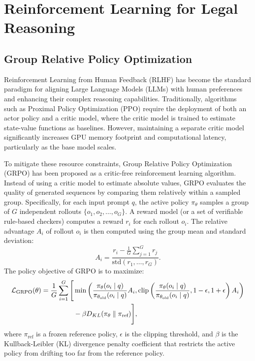 \section{Reinforcement Learning for Legal Reasoning}

\subsection{Group Relative Policy Optimization}

Reinforcement Learning from Human Feedback (RLHF) has become the standard paradigm for aligning Large Language Models (LLMs) with human preferences and enhancing their complex reasoning capabilities. Traditionally, algorithms such as Proximal Policy Optimization (PPO) require the deployment of both an actor policy and a critic model, where the critic model is trained to estimate state-value functions as baselines. However, maintaining a separate critic model significantly increases GPU memory footprint and computational latency, particularly as the base model scales.

To mitigate these resource constraints, Group Relative Policy Optimization (GRPO) has been proposed as a critic-free reinforcement learning algorithm. Instead of using a critic model to estimate absolute values, GRPO evaluates the quality of generated sequences by comparing them relatively within a sampled group. Specifically, for each input prompt $q$, the active policy $\pi_\theta$ samples a group of $G$ independent rollouts $\{o_1, o_2, \dots, o_G\}$. A reward model (or a set of verifiable rule-based checkers) computes a reward $r_i$ for each rollout $o_i$. The relative advantage $A_i$ of rollout $o_i$ is then computed using the group mean and standard deviation:
\begin{equation}
    A_i = \frac{r_i - \frac{1}{G}\sum_{j=1}^G r_j}{\text{std}(r_1, \dots, r_G)}.
\end{equation}
The policy objective of GRPO is to maximize:
\begin{align}
    \mathcal{L}_{\text{GRPO}}(\theta) = \frac{1}{G} \sum_{i=1}^G \Bigg[ &\min\left(
    \frac{\pi_\theta(o_i \mid q)}{\pi_{\theta_{\text{old}}}(o_i \mid q)} A_i,
    \text{clip}\left(\frac{\pi_\theta(o_i \mid q)}{\pi_{\theta_{\text{old}}}(o_i \mid q)}, 1-\epsilon, 1+\epsilon\right) A_i
    \right) \notag\\
    &{} - \beta D_{KL}(\pi_\theta \parallel \pi_{\text{ref}}) \Bigg],
\end{align}
where $\pi_{\text{ref}}$ is a frozen reference policy, $\epsilon$ is the clipping threshold, and $\beta$ is the Kullback-Leibler (KL) divergence penalty coefficient that restricts the active policy from drifting too far from the reference policy. 

